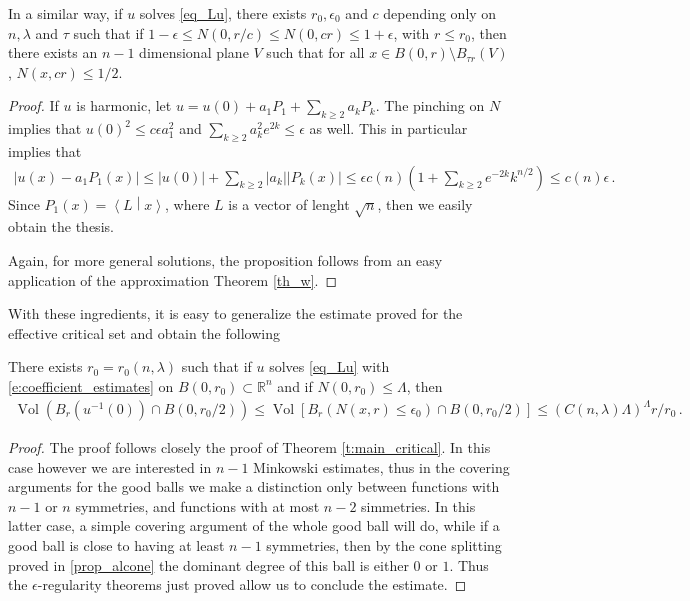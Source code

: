 \documentclass[11pt]{article}
\begin{document}
\begin{appendix}
\begin{proposition}
In a similar way, if $u$ solves \eqref{eq_Lu}, there exists $r_0,\epsilon_0$ and $c$ depending only on $n,\lambda$ and $\tau$ such that if $1-\epsilon\leq N(0,r/c)\leq N(0,c r)\leq 1+\epsilon$, with $r\leq r_0$, then there exists an $n-1$ dimensional plane $V$ such that for all $x\in B(0,r)\setminus B_{\tau r} (V)$, $N(x, c r) \leq 1/2$.
\end{proposition}
\begin{proof}
If $u$ is harmonic, let $u= u(0) + a_1 P_1 +\sum_{k\geq 2} a_k P_k$. The pinching on $N$ implies that $u(0)^2\leq c \epsilon a_1^2$ and $\sum_{k\geq 2} a_k^2 e^{2k}\leq \epsilon$ as well. This in particular implies that
\begin{gather}
 {\left|{u(x)-a_1P_1(x)}\right|}\leq {\left|{u(0)}\right|} + \sum_{k\geq 2} {\left|{a_k}\right|} {\left|{P_k(x)}\right|}\leq \epsilon c(n){\left({1+ \sum_{k\geq 2} e^{-2k} k^{n/2}}\right)}\leq c(n)\epsilon\, .
\end{gather}
Since $P_1(x)={\left\langle{L}\middle\vert{x}\right\rangle}$, where $L$ is a vector of lenght $\sqrt n$, then we easily obtain the thesis. 

Again, for more general solutions, the proposition follows from an easy application of the approximation Theorem \ref{th_w}.
\end{proof}

With these ingredients, it is easy to generalize the estimate proved for the effective critical set and obtain the following
\begin{theorem}
 There exists $r_0=r_0(n,\lambda)$ such that if $u$ solves \eqref{eq_Lu} with \eqref{e:coefficient_estimates} on $B(0,r_0)\subset {\mathbb{R}}^n$ and if $N(0,r_0)\leq \Lambda$, then
 \begin{gather}
  \operatorname{Vol}{\left({B_r{\left({u^{-1}(0)}\right)} \cap B(0,r_0/2)}\right)} \leq \operatorname{Vol}{\left[{B_r{\left({N(x,r)\leq\epsilon_0}\right)} \cap B(0,r_0/2)}\right]} \leq {\left({C(n,\lambda)\Lambda}\right)}^\Lambda r/r_0\, .
 \end{gather}

\end{theorem}
\begin{proof}
 The proof follows closely the proof of Theorem \ref{t:main_critical}. In this case however we are interested in $n-1$ Minkowski estimates, thus in the covering arguments for the good balls we make a distinction only between functions with $n-1$ or $n$ symmetries, and functions with at most $n-2$ simmetries. In this latter case, a simple covering argument of the whole good ball will do, while if a good ball is close to having at least $n-1$ symmetries, then by the cone splitting proved in \ref{prop_alcone} the dominant degree of this ball is either $0$ or $1$. Thus the $\epsilon$-regularity theorems just proved allow us to conclude the estimate.
\end{proof}


\end{appendix}
\end{document}
